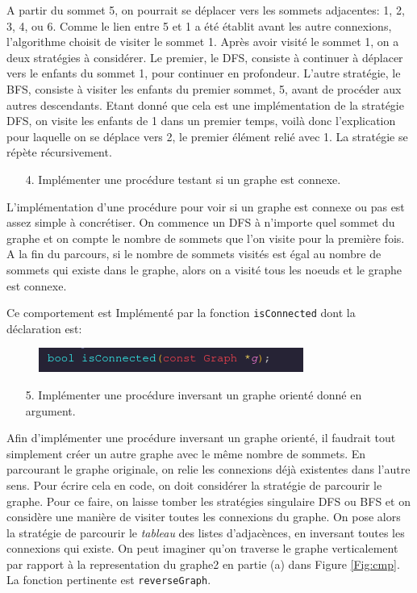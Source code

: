 \documentclass[10pt]{article} %
\begin{document}
A partir du sommet 5, on pourrait se déplacer vers les sommets adjacentes: 1, 2, 3, 4, ou 6. Comme le lien entre 5 et 1 a été établit avant les autre connexions,
l'algorithme choisit de visiter le sommet 1. Après avoir visité le sommet 1, on a deux stratégies à considérer. Le premier, le DFS, consiste à continuer à déplacer vers le
enfants du sommet 1, pour continuer en profondeur. L'autre stratégie, le BFS, consiste à visiter les enfants du premier sommet, 5, avant de procéder aux autres descendants. Etant donné
que cela est une implémentation de la stratégie DFS, on visite les enfants de 1 dans un premier temps, voilà donc l'explication pour laquelle on se déplace vers 2, le premier élément
relié avec 1. La stratégie se répète récursivement.

\begin{itemize}
    \item [4.] Implémenter une procédure testant si un graphe est connexe.
\end{itemize}

L'implémentation d'une procédure pour voir si un graphe est connexe ou pas est assez simple à concrétiser. On commence un DFS à n'importe quel sommet
du graphe et on compte le nombre de sommets que l'on visite pour la première fois. A la fin du parcours, si le nombre de sommets visités est égal au nombre de
sommets qui existe dans le graphe, alors on a visité tous les noeuds et le graphe est connexe.

Ce comportement est Implémenté par la fonction \texttt{isConnected} dont la déclaration est:

\begin{figure}[h!]
    \centering
    \includegraphics[height=.6cm]{media/isConnected.png}

\end{figure}

\begin{itemize}
    \item [5.] Implémenter une procédure inversant un graphe orienté donné en argument.
\end{itemize}

Afin d'implémenter une procédure inversant un graphe orienté, il faudrait tout simplement créer un autre graphe avec le même nombre de sommets.
En parcourant le graphe originale, on relie les connexions déjà existentes dans l'autre sens. Pour écrire cela en code, on doit considérer la stratégie de
parcourir le graphe. Pour ce faire, on laisse tomber les stratégies singulaire DFS ou BFS et on considère une manière de visiter toutes les connexions du graphe. On pose alors
la stratégie de parcourir le \textit{tableau} des listes d'adjacènces, en inversant toutes les connexions qui existe. On peut imaginer qu'on traverse le graphe verticalement par
rapport à la representation du graphe2 en partie (a) dans Figure \ref{Fig:cmp}. La fonction pertinente est \texttt{reverseGraph}.
\end{document}
